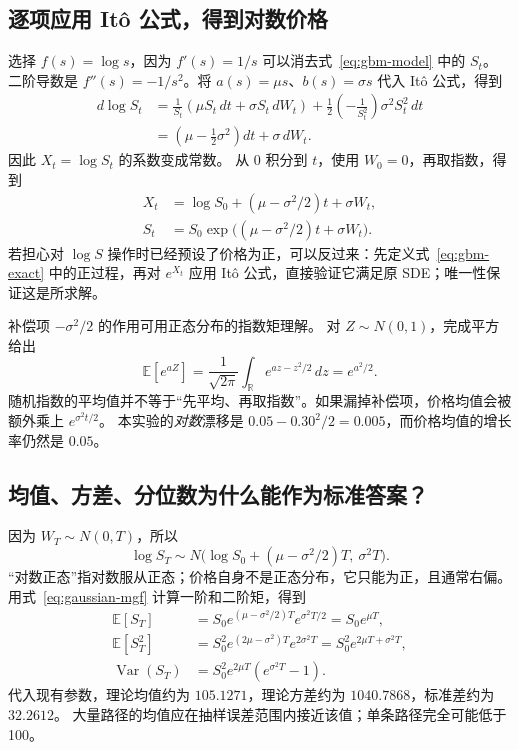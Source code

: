 \documentclass[11pt,a4paper,fontset=none]{ctexart}
\numberwithin{equation}{section}
\newcommand{\E}{\mathbb E}
\DeclareMathOperator{\Var}{Var}
\newcommand{\R}{\mathbb R}
\begin{document}
\subsection{逐项应用 Itô 公式，得到对数价格}
选择 $f(s)=\log s$，因为 $f'(s)=1/s$ 可以消去式~\eqref{eq:gbm-model} 中的 $S_t$。
二阶导数是 $f''(s)=-1/s^2$。将 $a(s)=\mu s$、$b(s)=\sigma s$ 代入 Itô 公式，得到
\begin{equation}\label{eq:gbm-log-derive}
\begin{aligned}
 d\log S_t
 &=\frac1{S_t}(\mu S_t\,dt+\sigma S_t\,dW_t)
   +\frac12\left(-\frac1{S_t^2}\right)\sigma^2S_t^2\,dt\\
 &=\left(\mu-\frac12\sigma^2\right)dt+\sigma\,dW_t.
\end{aligned}
\end{equation}
因此 $X_t=\log S_t$ 的系数变成常数。
从 $0$ 积分到 $t$，使用 $W_0=0$，再取指数，得到
\begin{align}
 X_t&=\log S_0+(\mu-\sigma^2/2)t+\sigma W_t,\label{eq:gbm-log-exact}\\
 S_t&=S_0\exp\bigl((\mu-\sigma^2/2)t+\sigma W_t\bigr).\label{eq:gbm-exact}
\end{align}
若担心对 $\log S$ 操作时已经预设了价格为正，可以反过来：先定义式~\eqref{eq:gbm-exact} 中的正过程，再对 $e^{X_t}$ 应用 Itô 公式，直接验证它满足原 SDE；唯一性保证这是所求解。

补偿项 $-\sigma^2/2$ 的作用可用正态分布的指数矩理解。
对 $Z\sim N(0,1)$，完成平方给出
\begin{equation}\label{eq:gaussian-mgf}
\E[e^{aZ}]=\frac1{\sqrt{2\pi}}\int_\R e^{az-z^2/2}\,dz
 =e^{a^2/2}.
\end{equation}
随机指数的平均值并不等于“先平均、再取指数”。如果漏掉补偿项，价格均值会被额外乘上 $e^{\sigma^2t/2}$。
本实验的\emph{对数}漂移是 $0.05-0.30^2/2=0.005$，而价格均值的增长率仍然是 $0.05$。

\subsection{均值、方差、分位数为什么能作为标准答案？}
因为 $W_T\sim N(0,T)$，所以
\begin{equation}\label{eq:gbm-normal}
 \log S_T\sim N\bigl(\log S_0+(\mu-\sigma^2/2)T,\ \sigma^2T\bigr).
\end{equation}
“对数正态”指对数服从正态；价格自身不是正态分布，它只能为正，且通常右偏。
用式~\eqref{eq:gaussian-mgf} 计算一阶和二阶矩，得到
\begin{align}
 \E[S_T]&=S_0e^{(\mu-\sigma^2/2)T}e^{\sigma^2T/2}=S_0e^{\mu T},\label{eq:gbm-mean}\\
 \E[S_T^2]&=S_0^2e^{(2\mu-\sigma^2)T}e^{2\sigma^2T}
 =S_0^2e^{2\mu T+\sigma^2T},\label{eq:gbm-second}\\
 \Var(S_T)&=S_0^2e^{2\mu T}(e^{\sigma^2T}-1).\label{eq:gbm-var}
\end{align}
代入现有参数，理论均值约为 $105.1271$，理论方差约为 $1040.7868$，标准差约为 $32.2612$。
大量路径的均值应在抽样误差范围内接近该值；单条路径完全可能低于 100。
\end{document}
